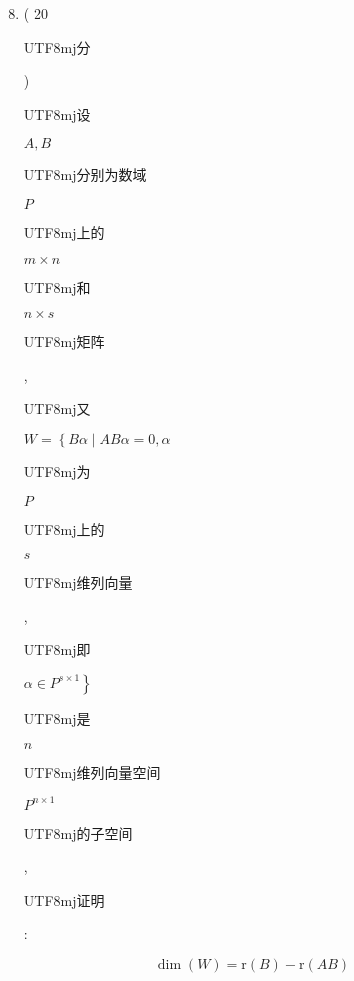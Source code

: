 \documentclass[10pt]{article}
\begin{document}
\begin{enumerate}
  \setcounter{enumi}{7}
  \item ( 20 \begin{CJK}{UTF8}{mj}分\end{CJK}) \begin{CJK}{UTF8}{mj}设\end{CJK} $A, B$ \begin{CJK}{UTF8}{mj}分别为数域\end{CJK} $P$ \begin{CJK}{UTF8}{mj}上的\end{CJK} $m \times n$ \begin{CJK}{UTF8}{mj}和\end{CJK} $n \times s$ \begin{CJK}{UTF8}{mj}矩阵\end{CJK}, \begin{CJK}{UTF8}{mj}又\end{CJK} $W=\left\{B \alpha \mid A B \alpha=0, \alpha\right.$ \begin{CJK}{UTF8}{mj}为\end{CJK} $P$ \begin{CJK}{UTF8}{mj}上的\end{CJK} $s$ \begin{CJK}{UTF8}{mj}维列向量\end{CJK}, \begin{CJK}{UTF8}{mj}即\end{CJK} $\left.\alpha \in P^{s \times 1}\right\}$ \begin{CJK}{UTF8}{mj}是\end{CJK} $n$ \begin{CJK}{UTF8}{mj}维列向量空间\end{CJK} $P^{n \times 1}$ \begin{CJK}{UTF8}{mj}的子空间\end{CJK}, \begin{CJK}{UTF8}{mj}证明\end{CJK}:
\end{enumerate}
$$
\operatorname{dim}(W)=\mathrm{r}(B)-\mathrm{r}(A B)
$$
\end{document}
